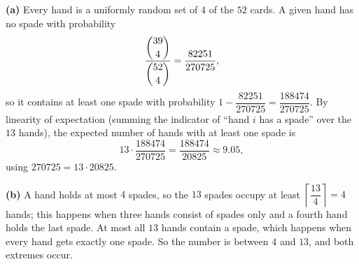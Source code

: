 \textbf{(a)} Every hand is a uniformly random set of $4$ of the $52$ cards. A given hand has no spade with probability
\[\dfrac{\dbinom{39}{4}}{\dbinom{52}{4}}=\dfrac{82251}{270725},\]
so it contains at least one spade with probability $1-\dfrac{82251}{270725}=\dfrac{188474}{270725}$. By linearity of expectation (summing the indicator of ``hand $i$ has a spade'' over the $13$ hands), the expected number of hands with at least one spade is
\[13\cdot\dfrac{188474}{270725}=\boxed{\dfrac{188474}{20825}}\approx9.05,\]
using $270725=13\cdot20825$.

\textbf{(b)} A hand holds at most $4$ spades, so the $13$ spades occupy at least $\left\lceil\dfrac{13}{4}\right\rceil=4$ hands; this happens when three hands consist of spades only and a fourth hand holds the last spade. At most all $13$ hands contain a spade, which happens when every hand gets exactly one spade. So the number is between $\boxed{4}$ and $\boxed{13}$, and both extremes occur.

